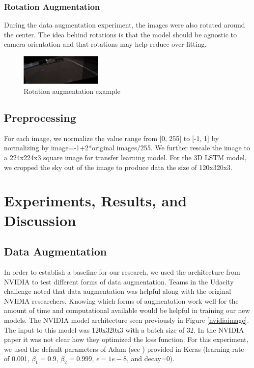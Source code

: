 \documentclass[10pt,twocolumn,letterpaper]{article}
\begin{document}
\subsubsection{Rotation Augmentation}
During the data augmentation experiment, the images were also rotated around the center. The idea behind rotations is that the model should be agnostic to camera orientation and that rotations may help reduce over-fitting.

\begin{figure}[!htb]
	\includegraphics[width=4cm]{data_aug_rot.JPG}
	\centering
	\caption{Rotation augmentation example}
	\label{rotaion_aug}
\end{figure}

\subsection{Preprocessing}
For each image, we normalize the value range from [0, 255] to [-1, 1] by normalizing by image=-1+2*original images/255. We further rescale the image to a 224x224x3 square image for transfer learning model. For the 3D LSTM model, we cropped the sky out of the image to produce data the size of 120x320x3.


\section{Experiments, Results, and Discussion}

\subsection{Data Augmentation}
In order to establish a baseline for our research, we used the architecture from NVIDIA \cite{bojarski2016end} to test different forms of data augmentation. Teams in the Udacity challenge noted that data augmentation was helpful along with the original NVIDIA researchers. Knowing which forms of augmentation work well for the amount of time and computational available would be helpful in training our new models. The NVIDIA model architecture seen previously in Figure \ref{nvidiaimage}. The input to this model was 120x320x3 with a batch size of 32. In the NVIDIA paper \cite{bojarski2016end} it was not clear how they optimized the loss function. For this experiment, we used the default parameters of Adam (see \cite{kingma2014adam}) provided in Keras (learning rate of 0.001, $\beta_{1}=0.9$, $\beta_{2}=0.999$, $\epsilon=1e-8$, and decay=0).
\end{document}
